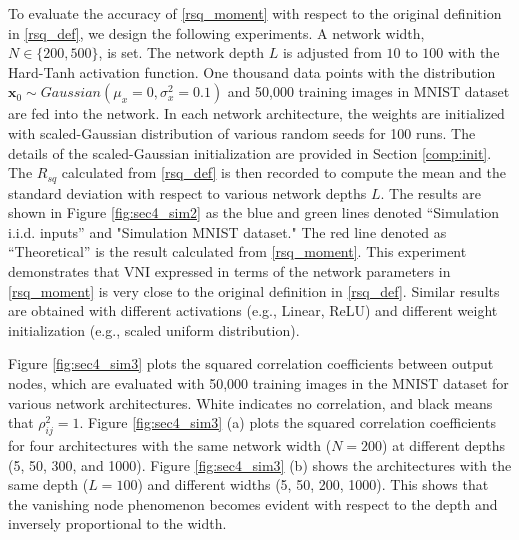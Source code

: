 To evaluate the accuracy of \eqref{rsq_moment} with respect to the original definition in \eqref{rsq_def}, we design the following experiments. A network width, $N\in\{200, 500\}$, is set. The network depth $L$ is adjusted from $10$ to $100$ with the Hard-Tanh activation function.
One thousand data points with the distribution $\mathbf{x}_0\sim Gaussian(\mu_x=0, \sigma^2_x=0.1)$ and 50,000 training images in MNIST dataset \cite{mnist} are fed into the network.
In each network architecture, the weights are initialized with scaled-Gaussian distribution \cite{xavier} of various random seeds for 100 runs.
The details of the scaled-Gaussian initialization are provided in Section \ref{comp:init}.
The $R_{sq}$ calculated from \eqref{rsq_def} is then recorded to compute the mean and the standard deviation with respect to various network depths $L$.
The results are shown in Figure \ref{fig:sec4_sim2} as the blue and green lines denoted “Simulation i.i.d. inputs” and "Simulation MNIST dataset." The red line denoted as “Theoretical” is the result calculated from \eqref{rsq_moment}. This experiment demonstrates that VNI expressed in terms of the network parameters in \eqref{rsq_moment} is very close to the original definition in \eqref{rsq_def}.
Similar results are obtained with different activations (e.g., Linear, ReLU) and different weight initialization (e.g., scaled uniform distribution).

Figure \ref{fig:sec4_sim3} plots the squared correlation coefficients between output nodes, which are evaluated with 50,000 training images in the MNIST dataset \cite{mnist} for various network architectures. White indicates no correlation, and black means that $\rho_{ij}^2 = 1$. Figure \ref{fig:sec4_sim3} (a) plots the squared correlation coefficients for four architectures with the same network width ($N=200$) at different depths (5, 50, 300, and 1000). Figure \ref{fig:sec4_sim3} (b) shows the architectures with the same depth ($L=100$) and different widths (5, 50, 200, 1000).  
This shows that the vanishing node phenomenon becomes evident with respect to the depth and inversely proportional to the width.


